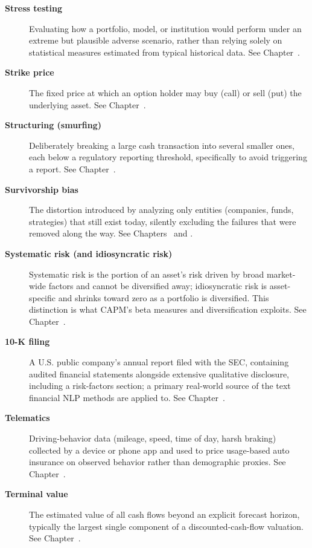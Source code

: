 \documentclass[../ai_in_finance]{subfiles}
\begin{document}
\begin{description}
\item[\textbf{Stress testing}] Evaluating how a portfolio, model, or institution would perform under an extreme but plausible adverse scenario, rather than relying solely on statistical measures estimated from typical historical data. See Chapter~.

\item[\textbf{Strike price}] The fixed price at which an option holder may buy (call) or sell (put) the underlying asset. See Chapter~.

\item[\textbf{Structuring (smurfing)}] Deliberately breaking a large cash transaction into several smaller ones, each below a regulatory reporting threshold, specifically to avoid triggering a report. See Chapter~.

\item[\textbf{Survivorship bias}] The distortion introduced by analyzing only entities (companies, funds, strategies) that still exist today, silently excluding the failures that were removed along the way. See Chapters~ and .

\item[\textbf{Systematic risk (and idiosyncratic risk)}] Systematic risk is the portion of an asset's risk driven by broad market-wide factors and cannot be diversified away; idiosyncratic risk is asset-specific and shrinks toward zero as a portfolio is diversified. This distinction is what CAPM's beta measures and diversification exploits. See Chapter~.

\item[\textbf{10-K filing}] A U.S. public company's annual report filed with the SEC, containing audited financial statements alongside extensive qualitative disclosure, including a risk-factors section; a primary real-world source of the text financial NLP methods are applied to. See Chapter~.

\item[\textbf{Telematics}] Driving-behavior data (mileage, speed, time of day, harsh braking) collected by a device or phone app and used to price usage-based auto insurance on observed behavior rather than demographic proxies. See Chapter~.

\item[\textbf{Terminal value}] The estimated value of all cash flows beyond an explicit forecast horizon, typically the largest single component of a discounted-cash-flow valuation. See Chapter~.


\end{description}
\end{document}
